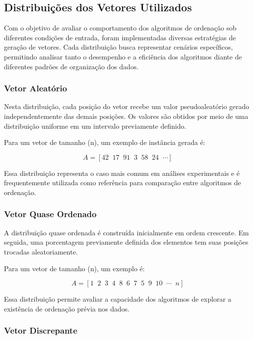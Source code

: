 \documentclass{article}
\begin{document}
\subsection{Distribuições dos Vetores Utilizados}

Com o objetivo de avaliar o comportamento dos algoritmos de ordenação sob diferentes condições de entrada, foram implementadas diversas estratégias de geração de vetores. 
Cada distribuição busca representar cenários específicos, permitindo analisar tanto o desempenho e a eficiência dos algoritmos diante de diferentes padrões de organização dos dados.

\subsubsection{Vetor Aleatório}

Nesta distribuição, cada posição do vetor recebe um valor pseudoaleatório gerado independentemente das demais posições. 
Os valores são obtidos por meio de uma distribuição uniforme em um intervalo previamente definido.

Para um vetor de tamanho (n), um exemplo de instância gerada é:

\[
A =
[42 \;\; 17 \;\; 91 \;\; 3 \;\; 58 \;\; 24 \;\; \cdots]
\]

Essa distribuição representa o caso mais comum em análises experimentais e é frequentemente utilizada como referência para comparação entre algoritmos de ordenação.

\subsubsection{Vetor Quase Ordenado}

A distribuição quase ordenada é construída inicialmente em ordem crescente. Em seguida, uma porcentagem previamente definida dos elementos tem suas posições trocadas aleatoriamente.

Para um vetor de tamanho (n), um exemplo é:

\[
A =
[1 \;\; 2 \;\; 3 \;\; 4 \;\; 8 \;\; 6 \;\; 7 \;\; 5 \;\; 9 \;\; 10 \;\; \cdots \;\; n]
\]

Essa distribuição permite avaliar a capacidade dos algoritmos de explorar a existência de ordenação prévia nos dados.

\subsubsection{Vetor Discrepante}
\end{document}
